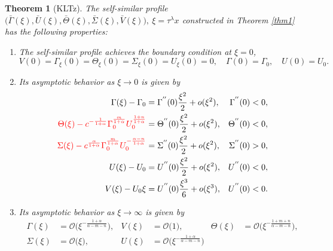 \documentclass[a4paper,11pt]{article}
\def\red{\color{red}}
\def\bG{{\bar{\Gamma}}}
\def\bV{{\bar{V}}}
\def\bTh{{\bar{\Theta}}}
\def\bS{{\bar{\Sigma}}}
\def\bU{{\bar{U}}}
\def\BO{{\mathcal{O}}}
\newtheorem{theorem}{Theorem}
\theoremstyle{remark}
\begin{document}
\begin{theorem}[KLTz]
The self-similar profile $\big(\bG(\xi), \bU(\xi), \bTh(\xi),\bS(\xi),\bV(\xi)\big), \ \xi = \tau^\lambda x$ constructed in Theorem \ref{thm1} has the  following properties:

 \begin{enumerate}
  \item[(i)] The self-similar profile achieves the boundary condition at $\xi=0$,
    \begin{equation*}
    {V}(0) = \Gamma_\xi(0) = \Theta_\xi(0)=\Sigma_\xi(0) = {U}_\xi(0)=0, \quad \Gamma(0)=\Gamma_0, \quad U(0)=U_0.
  \end{equation*}
  \item[(ii)] Its asymptotic behavior as $\xi \rightarrow 0$ is given by
  \begin{equation} \label{eq:ss_asymp0}
  \begin{aligned}
    \Gamma(\xi) -\Gamma_0 &= \Gamma^{''}(0)\frac{\xi^2}{2} + o(\xi^2), & \Gamma^{''}(0)&<0,\\
    \red \Theta(\xi) - c^{-\frac{1}{1+\alpha}}\Gamma_0^{\frac{m}{1+\alpha}} U_0^{\frac{1+n}{1+\alpha}} &= \Theta^{''}(0)\frac{\xi^2}{2} + o(\xi^2), & \Theta^{''}(0)&<0,\\
    \red \Sigma(\xi) - c^{\frac{\alpha}{1+\alpha}}\Gamma_0^{\frac{m}{1+\alpha}} U_0^{-\frac{\alpha-n}{1+\alpha}} &= \Sigma^{''}(0)\frac{\xi^2}{2} + o(\xi^2), & \Sigma^{''}(0)&>0, \\
    U(\xi) - U_0 &= U^{''}(0)\frac{\xi^2}{2} + o(\xi^2), & U^{''}(0)&<0,\\
    V(\xi) - U_0\xi &= U^{''}(0)\frac{\xi^3}{6} + o(\xi^3), & U^{''}(0)&<0.
  \end{aligned}
  \end{equation}
  \item[(iii)] Its asymptotic behavior as $\xi \rightarrow \infty$ is given by\\
  \begin{equation} \label{eq:ss_asymp1}
  \begin{aligned}
    \Gamma(\xi) &= \BO\big(\xi^{-\frac{1+\alpha}{\alpha-m-n}}), & V(\xi) &= \BO\big(1), &    \Theta(\xi) &= \BO\big(\xi^{-\frac{1+m+n}{\alpha-m-n}}),\\
   \Sigma(\xi) &= \BO\big(\xi), &   U(\xi) &= \BO\big(\xi^{-\frac{1+\alpha}{\alpha-m-n}})
  \end{aligned}
  \end{equation}
 \end{enumerate}
\end{theorem}
\end{document}
